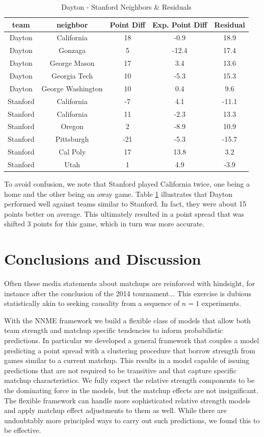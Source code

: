 \documentclass[letterpaper,12pt]{article}
\begin{document}
\begin{table}[h!]
\caption{Dayton - Stanford Neighbors \& Residuals}
\small
\centering
\begin{tabular}{|c|cccc |}
   \hline
   \hline
 team & neighbor &  Point Diff& Exp. Point Diff & Residual \\
  \hline
Dayton & California & 18 & -0.9 & 18.9\\
Dayton & Gonzaga & 5 & -12.4 & 17.4\\
Dayton & George Mason& 17 & 3.4 & 13.6\\
Dayton &  Georgia Tech& 10 & -5.3 & 15.3\\
Dayton & George Washington& 10 & 0.4 & 9.6\\
\hline
Stanford & California&-7 & 4.1&-11.1 \\
Stanford & California &11 &-2.3 &13.3 \\
Stanford & Oregon&2 &-8.9 &10.9 \\
Stanford & Pittsburgh&-21 &-5.3 &-15.7 \\
Stanford & Cal Poly&17 &13.8 &3.2 \\
Stanford & Utah&1 &4.9 &-3.9 \\
   \hline
   \hline
\end{tabular}
\label{tab:DayStan}
\end{table}
To avoid confusion, we note that Stanford played California twice, one being a home and the other being an away game.  Table \ref{tab:DayStan} illustrates that Dayton performed well against teams similar to Stanford. In fact, they were about 15 points better on average. This ultimately resulted in a point spread that was shifted 3 points for this game, which in turn was more accurate.

\section{Conclusions and Discussion}
Often these media statements about matchups are reinforced with hindsight, for instance after the conclusion of the 2014 tournament... This exercise is dubious statistically akin to seeking causality from a sequence of $n=1$ experiments.


With the NNME framework we build a flexible class of models that allow both team strength and matchup specific tendencies to inform probabilistic predictions. In particular we developed a general framework that couples a model predicting a point spread with a clustering procedure that borrow strength from games similar to a current matchup. This results in a model capable of issuing predictions that are not required to be transitive and that capture specific matchup characteristics. We fully expect the relative strength components to be the dominating force in the models, but the matchup effects are not insignificant. The flexible framework can handle more sophisticated relative strength models and apply matchup effect adjustments to them as well. While there are undoubtably more principled ways to carry out such predictions, we found this to be effective.
\end{document}
